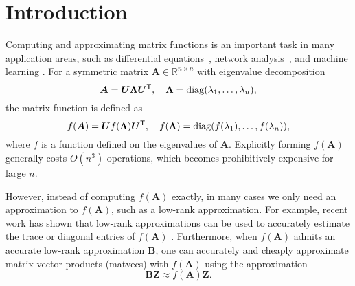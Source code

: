 \section{Introduction}

Computing and approximating matrix functions is an important task in many application areas, such as differential equations~\cite{havel1994matrix,highamscaleandsquare}, network analysis~\cite{estrada2000characterization,estradahigham}, and machine learning \cite{DongErikssonNickisch:2017,PleissJankowiakEriksson:2020}. For a symmetric matrix $\bm{A} \in \mathbb{R}^{n \times n}$ with eigenvalue decomposition 
\begin{equation*}
    \bm{A} = \bm{U} \bm{\Lambda} \bm{U}^{\textsf{\textup{T}}}, \quad \bm{\Lambda} = \operatorname{diag}(\lambda_1,\ldots,\lambda_n),
\end{equation*}
the matrix function is defined as 
\begin{equation*}
    f(\bm{A}) = \bm{U} f(\bm{\Lambda}) \bm{U}^{\textsf{\textup{T}}}, \quad f(\bm{\Lambda}) = \operatorname{diag}(f(\lambda_1),\ldots,f(\lambda_n)),
\end{equation*}
where $f$ is a function defined on the eigenvalues of $\bm{A}$. Explicitly forming $f(\bm{A})$ generally costs $O(n^3)$ operations, which becomes prohibitively expensive for large $n$. 

However, instead of computing $f(\bm{A})$ exactly, in many cases we only need an approximation to $f(\bm{A})$, such as a low-rank approximation. For example, recent work has shown that low-rank approximations can be used to accurately estimate the trace or diagonal entries of $f(\bm{A})$ \cite{baston2022stochastic,epperly2023xtrace,jiang2021optimal,hpp, ahpp}. Furthermore, when $f(\bm{A})$ admits an accurate low-rank approximation $\bm{B}$, one can accurately and cheaply approximate matrix-vector products (matvecs) with $f(\bm{A})$ using the approximation
\begin{equation*}
    \bm{B} \bm{Z} \approx f(\bm{A}) \bm{Z}.
\end{equation*}

